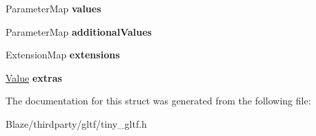 \begin{DoxyCompactItemize}
\item 
\mbox{\label{structtinygltf_1_1Material_a9b74316106064a594ea375814d6ad41d}} 
Parameter\+Map {\bfseries values}
\item 
\mbox{\label{structtinygltf_1_1Material_a513dff50921d773688c9d04e047197c3}} 
Parameter\+Map {\bfseries additional\+Values}
\item 
\mbox{\label{structtinygltf_1_1Material_a1f2d9131b915959bbe7826d6660c78ea}} 
Extension\+Map {\bfseries extensions}
\item 
\mbox{\label{structtinygltf_1_1Material_a5481ffb1c2d0bd1c53ff8e7a7bedc943}} 
\hyperlink{classtinygltf_1_1Value}{Value} {\bfseries extras}
\end{DoxyCompactItemize}


The documentation for this struct was generated from the following file\+:\begin{DoxyCompactItemize}
\item 
Blaze/thirdparty/gltf/tiny\+\_\+gltf.\+h\end{DoxyCompactItemize}
